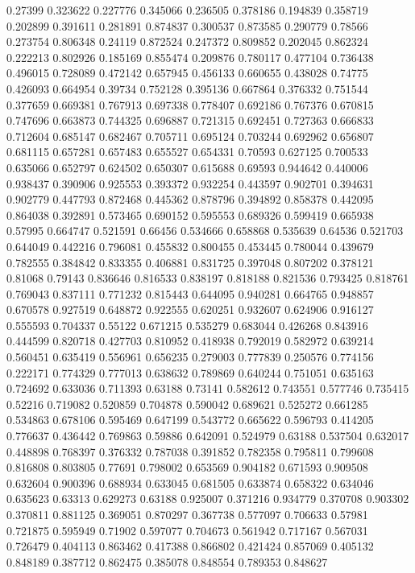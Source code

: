 0.27399 0.323622
0.227776 0.345066
0.236505 0.378186
0.194839 0.358719
0.202899 0.391611
0.281891 0.874837
0.300537 0.873585
0.290779 0.78566
0.273754 0.806348
0.24119 0.872524
0.247372 0.809852
0.202045 0.862324
0.222213 0.802926
0.185169 0.855474
0.209876 0.780117
0.477104 0.736438
0.496015 0.728089
0.472142 0.657945
0.456133 0.660655
0.438028 0.74775
0.426093 0.664954
0.39734 0.752128
0.395136 0.667864
0.376332 0.751544
0.377659 0.669381
0.767913 0.697338
0.778407 0.692186
0.767376 0.670815
0.747696 0.663873
0.744325 0.696887
0.721315 0.692451
0.727363 0.666833
0.712604 0.685147
0.682467 0.705711
0.695124 0.703244
0.692962 0.656807
0.681115 0.657281
0.657483 0.655527
0.654331 0.70593
0.627125 0.700533
0.635066 0.652797
0.624502 0.650307
0.615688 0.69593
0.944642 0.440006
0.938437 0.390906
0.925553 0.393372
0.932254 0.443597
0.902701 0.394631
0.902779 0.447793
0.872468 0.445362
0.878796 0.394892
0.858378 0.442095
0.864038 0.392891
0.573465 0.690152
0.595553 0.689326
0.599419 0.665938
0.57995 0.664747
0.521591 0.66456
0.534666 0.658868
0.535639 0.64536
0.521703 0.644049
0.442216 0.796081
0.455832 0.800455
0.453445 0.780044
0.439679 0.782555
0.384842 0.833355
0.406881 0.831725
0.397048 0.807202
0.378121 0.81068
0.79143 0.836646
0.816533 0.838197
0.818188 0.821536
0.793425 0.818761
0.769043 0.837111
0.771232 0.815443
0.644095 0.940281
0.664765 0.948857
0.670578 0.927519
0.648872 0.922555
0.620251 0.932607
0.624906 0.916127
0.555593 0.704337
0.55122 0.671215
0.535279 0.683044
0.426268 0.843916
0.444599 0.820718
0.427703 0.810952
0.418938 0.792019
0.582972 0.639214
0.560451 0.635419
0.556961 0.656235
0.279003 0.777839
0.250576 0.774156
0.222171 0.774329
0.777013 0.638632
0.789869 0.640244
0.751051 0.635163
0.724692 0.633036
0.711393 0.63188
0.73141 0.582612
0.743551 0.577746
0.735415 0.52216
0.719082 0.520859
0.704878 0.590042
0.689621 0.525272
0.661285 0.534863
0.678106 0.595469
0.647199 0.543772
0.665622 0.596793
0.414205 0.776637
0.436442 0.769863
0.59886 0.642091
0.524979 0.63188
0.537504 0.632017
0.448898 0.768397
0.376332 0.787038
0.391852 0.782358
0.795811 0.799608
0.816808 0.803805
0.77691 0.798002
0.653569 0.904182
0.671593 0.909508
0.632604 0.900396
0.688934 0.633045
0.681505 0.633874
0.658322 0.634046
0.635623 0.63313
0.629273 0.63188
0.925007 0.371216
0.934779 0.370708
0.903302 0.370811
0.881125 0.369051
0.870297 0.367738
0.577097 0.706633
0.57981 0.721875
0.595949 0.71902
0.597077 0.704673
0.561942 0.717167
0.567031 0.726479
0.404113 0.863462
0.417388 0.866802
0.421424 0.857069
0.405132 0.848189
0.387712 0.862475
0.385078 0.848554
0.789353 0.848627

